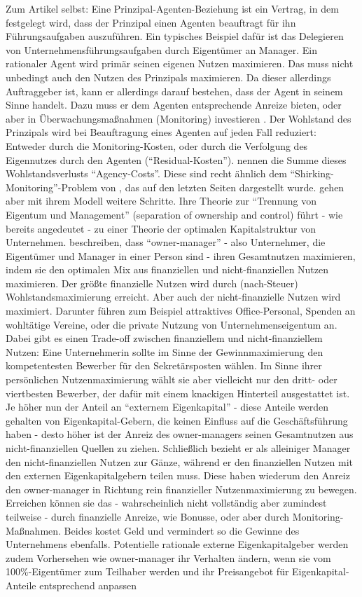 Zum Artikel selbst: Eine Prinzipal-Agenten-Beziehung ist ein Vertrag, in dem festgelegt wird, dass der Prinzipal einen Agenten beauftragt für ihn Führungsaufgaben auszuführen. Ein typisches Beispiel dafür ist das Delegieren von Unternehmensführungsaufgaben durch Eigentümer an Manager. Ein rationaler Agent wird primär seinen eigenen Nutzen maximieren. Das muss nicht unbedingt auch den Nutzen des Prinzipals maximieren. Da dieser allerdings Auftraggeber ist, kann er allerdings darauf bestehen, dass der Agent in seinem Sinne handelt. Dazu muss er dem Agenten entsprechende Anreize bieten, oder aber in Überwachungsmaßnahmen (Monitoring) investieren \parencite[S. 310]{Jensen1976}. Der  Wohlstand des Prinzipals wird bei Beauftragung eines Agenten auf jeden Fall reduziert: Entweder durch die Monitoring-Kosten, oder durch die Verfolgung des Eigennutzes durch den Agenten ("`Residual-Kosten"'). \textcite{Jensen1976} nennen die Summe dieses Wohlstandsverlusts "`Agency-Costs"'. Diese sind recht ähnlich dem "`Shirking-Monitoring"'-Problem von \textcite{Alchian1972}, das auf den letzten Seiten dargestellt wurde. \textcite{Jensen1976} gehen aber mit ihrem Modell weitere Schritte. Ihre Theorie zur "`Trennung von Eigentum und Management"' (separation of ownership and control) führt - wie bereits angedeutet - zu einer Theorie der optimalen Kapitalstruktur von Unternehmen. \textcite{Jensen1976} beschreiben, dass "`owner-manager"' - also Unternehmer, die Eigentümer und Manager in einer Person sind - ihren Gesamtnutzen maximieren, indem sie den optimalen Mix aus finanziellen und nicht-finanziellen Nutzen maximieren. Der größte finanzielle Nutzen wird durch (nach-Steuer) Wohlstandsmaximierung erreicht. Aber auch der nicht-finanzielle Nutzen wird maximiert. Darunter führen \textcite[S. 316]{Jensen1976} zum Beispiel attraktives Office-Personal, Spenden an wohltätige Vereine, oder die private Nutzung von Unternehmenseigentum an. Dabei gibt es einen Trade-off zwischen finanziellem und nicht-finanziellem Nutzen: Eine Unternehmerin sollte im Sinne der Gewinnmaximierung den kompetentesten Bewerber für den Sekretärsposten wählen. Im Sinne ihrer persönlichen Nutzenmaximierung wählt sie aber vielleicht nur den dritt- oder viertbesten Bewerber, der dafür mit einem knackigen Hinterteil ausgestattet ist. Je höher nun der Anteil an "`externem Eigenkapital"' - diese Anteile werden gehalten von Eigenkapital-Gebern, die keinen Einfluss auf die Geschäftsführung haben - desto höher ist der Anreiz des owner-managers seinen Gesamtnutzen aus nicht-finanziellen Quellen zu ziehen. Schließlich bezieht er als alleiniger Manager den nicht-finanziellen Nutzen zur Gänze, während er den finanziellen Nutzen mit den externen Eigenkapitalgebern teilen muss. Diese haben wiederum den Anreiz den owner-manager in Richtung rein finanzieller Nutzenmaximierung zu bewegen. Erreichen können sie das - wahrscheinlich nicht vollständig aber zumindest teilweise - durch finanzielle Anreize, wie Bonusse, oder aber durch Monitoring-Maßnahmen. Beides kostet Geld und vermindert so die Gewinne des Unternehmens ebenfalls. Potentielle rationale externe Eigenkapitalgeber werden zudem Vorhersehen wie owner-manager ihr Verhalten ändern, wenn sie vom 100\%-Eigentümer zum Teilhaber werden und ihr Preisangebot für Eigenkapital-Anteile entsprechend anpassen 